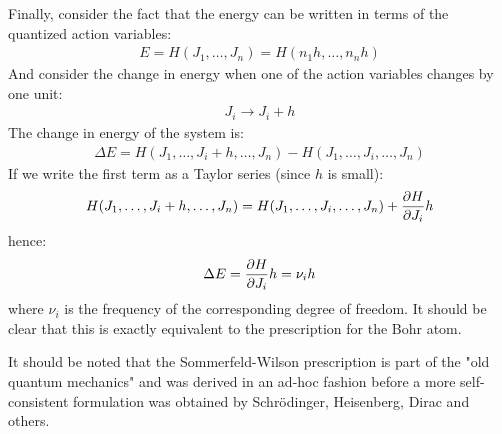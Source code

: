 Finally, consider the fact that the energy can be written in terms of the quantized action variables:
\begin{align}
E=H(J_1,\dots, J_n)=H(n_1h,\dots,n_nh)
\end{align}
And consider the change in energy when one of the action variables changes by one unit:
\begin{align}
J_i\to J_i+h
\end{align}
The change in energy of the system is:
\begin{align}
\Delta E= H(J_1,\dots,J_i+h,\dots, J_n)-H(J_1,\dots,J_i,\dots, J_n)
\end{align}
If we write the first term as a Taylor series (since $h$ is small):
\begin{align}
H(J_1,\dots,J_i+h,\dots, J_n)=H(J_1,\dots,J_i,\dots, J_n)+\frac{\partial H}{\partial J_i}h
\end{align}
hence:
\begin{align}
\Delta E=\frac{\partial H}{\partial J_i}h=\nu_i h
\end{align}
where $\nu_i$ is the frequency of the corresponding degree of freedom. It should be clear that this is exactly equivalent to the prescription for the Bohr atom.

It should be noted that the Sommerfeld-Wilson prescription is part of the "old quantum mechanics" and was derived in an ad-hoc fashion before a more self-consistent formulation was obtained by Schr\"odinger, Heisenberg, Dirac and others.

